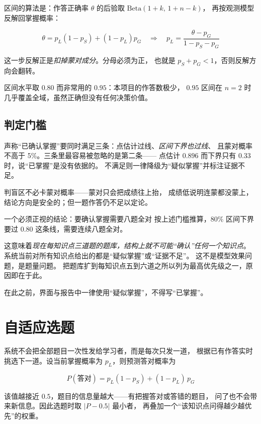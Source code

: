 区间的算法是：作答正确率 $\theta$ 的后验取 $\mathrm{Beta}(1+k,\,1+n-k)$，
再按观测模型反解回掌握概率：

\begin{equation}
\theta = p_L(1-p_S) + (1-p_L)p_G
\quad\Longrightarrow\quad
p_L = \frac{\theta - p_G}{1 - p_S - p_G}
\end{equation}

这一步反解正是\emph{扣掉蒙对成分}。分母必须为正，
也就是 $p_S + p_G < 1$，否则反解方向会翻转。

区间水平取 $0.80$ 而非常用的 $0.95$：本项目的作答数极少，
$0.95$ 区间在 $n=2$ 时几乎覆盖全域，虽然正确但没有任何决策价值。

\subsection{判定门槛}

声称“已确认掌握”要同时满足三条：点估计过线、\emph{区间下界也过线}、
且蒙对概率不高于 5\%。三条里最容易被忽略的是第二条——
点估计 $0.896$ 而下界只有 $0.33$ 时，说“已掌握”是没有依据的。
不满足则一律降级为“疑似掌握”并标注证据不足。

判盲区不必卡蒙对概率——蒙对只会把成绩往上抬，
成绩低说明连蒙都没蒙上，结论方向是安全的；但一题作答仍不足以定论。

\begin{keynote}{一个必须正视的结论：要确认掌握需要八题全对}
按上述门槛推算，$80\%$ 区间下界要过 $0.80$ 这条线，需要连续八题全对。

这意味着\emph{现在每知识点三道题的题库，结构上就不可能“确认”任何一个知识点}。
系统当前对所有知识点给出的都是“疑似掌握”或“证据不足”。
这不是模型效果问题，是题量问题。
把题库扩到每知识点五到六道之所以列为最高优先级之一，原因即在于此。

在此之前，界面与报告中一律使用“疑似掌握”，不得写“已掌握”。
\end{keynote}

\section{自适应选题}

系统不会把全部题目一次性发给学习者，而是每次只发一道，
根据已有作答实时挑选下一道。设当前掌握概率为 $p_L$，则预测答对概率为

\begin{equation}
P(\text{答对}) = p_L(1-p_S) + (1-p_L)\,p_G
\end{equation}

该值越接近 $0.5$，题目的信息量越大——有把握答对或答错的题目，
问了也不会带来新信息。因此选题时取 $|P - 0.5|$ 最小者，
再叠加一个“该知识点问得越少越优先”的权重。

